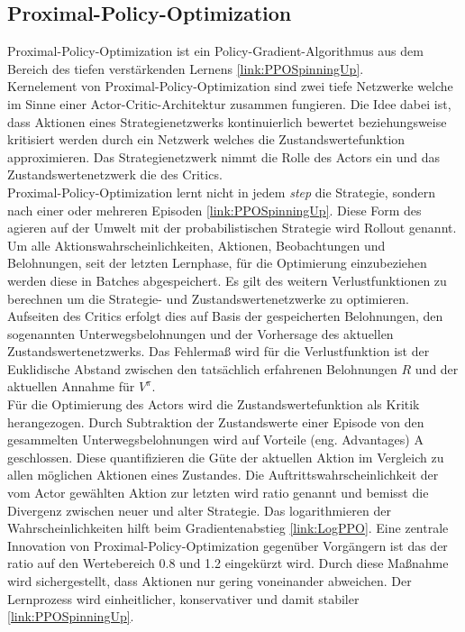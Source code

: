 \subsection{\label{ppo}Proximal-Policy-Optimization}
Proximal-Policy-Optimization ist ein Policy-Gradient-Algorithmus aus dem Bereich des tiefen verstärkenden Lernens \ref{link:PPOSpinningUp}.\\
Kernelement von Proximal-Policy-Optimization sind zwei tiefe Netzwerke welche im Sinne einer Actor-Critic-Architektur zusammen fungieren. Die Idee dabei ist, dass Aktionen eines Strategienetzwerks kontinuierlich bewertet beziehungsweise kritisiert werden durch ein Netzwerk welches die Zustandswertefunktion approximieren. Das Strategienetzwerk nimmt die Rolle des Actors ein und das Zustandswertenetzwerk die des Critics.\\
Proximal-Policy-Optimization lernt nicht in jedem \textit{step} die Strategie, sondern nach einer oder mehreren Episoden \ref{link:PPOSpinningUp}. Diese Form des agieren auf der Umwelt mit der probabilistischen Strategie wird Rollout genannt. Um alle Aktionswahrscheinlichkeiten, Aktionen, Beobachtungen und Belohnungen, seit der letzten Lernphase, für die Optimierung einzubeziehen werden diese in Batches abgespeichert. Es gilt des weitern Verlustfunktionen zu berechnen um die Strategie- und Zustandswertenetzwerke zu optimieren. Aufseiten des Critics erfolgt dies auf Basis der gespeicherten Belohnungen, den sogenannten Unterwegsbelohnungen und der Vorhersage des aktuellen Zustandswertenetzwerks. Das Fehlermaß wird für die Verlustfunktion ist der Euklidische Abstand zwischen den tatsächlich erfahrenen Belohnungen $R$ und der aktuellen Annahme für $V^{\pi}$.\\
Für die Optimierung des Actors wird die Zustandswertefunktion als Kritik herangezogen. Durch Subtraktion der Zustandswerte einer Episode von den gesammelten Unterwegsbelohnungen wird auf Vorteile (eng. Advantages) A geschlossen. Diese quantifizieren die Güte der aktuellen Aktion im Vergleich zu allen möglichen Aktionen eines Zustandes.
Die Auftrittswahrscheinlichkeit der vom Actor gewählten Aktion zur letzten wird ratio genannt und bemisst die Divergenz zwischen neuer und alter Strategie. Das logarithmieren der Wahrscheinlichkeiten hilft beim Gradientenabstieg \ref{link:LogPPO}.
Eine zentrale Innovation von Proximal-Policy-Optimization gegenüber Vorgängern ist das der ratio auf den Wertebereich 0.8 und 1.2 eingekürzt wird. Durch diese Maßnahme wird sichergestellt, dass Aktionen nur gering voneinander abweichen. Der Lernprozess wird einheitlicher, konservativer und damit stabiler \ref{link:PPOSpinningUp}.
